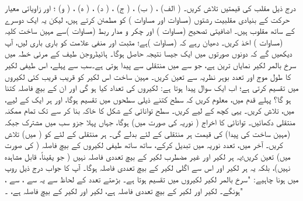 درج ذیل مقلب کی قیمتیں تلاش کریں۔
 ( الف) ، ( ب) ،
  ( ج) ، ( د) ،
   ( ه) ، ( و) ؛
      اور  زاویائی معیار حرکت کے بنیادی مقلبیت رشتوں  (مساوات    اور مساوات ) کو مطمئن کرتے ہیں،  لیکن یہ ایک دوسرے کے ساتھ مقلوب ہیں۔ 
اضافیتی تصحیح (مساوات )  اور چکر و مدار  ربط (مساوات  )سے مہین ساخت کلیہ  (مساوات )  اخذ  کریں۔  دھیان رہے کہ   (مساوات )ہے؛  مثبت  اور منفی علامت کو باری باری لیں، آپ دیکھیں گے کہ دونوں صورتوں میں  ایک    جیسا نتیجہ حاصل  ہوگا۔ 
 ہائیڈروجن     طیف  کے مرئی خطہ میں   سرخ  بالمر لکیر نمایاں ترین  ہے،  جو  سے  میں منتقلی سے پیدا ہوتی ہے۔سب سے پہلے،  اس طیفی  لکیر کا طول موج اور تعدد بوہر نظریہ سے تعین کریں۔  مہین ساخت اس لکیر کو قریب قریب کئی لکیروں میں تقسیم کرتی ہے؛   اب ایک سوال  پیدا ہوتا ہے: لکیروں کی تعداد کیا ہو گی  اور ان  کے بیچ فاصلہ کتنا ہو گا؟   پہلے قدم میں،  معلوم کریں کہ  سطح کتنے  ذیلی سطحوں میں تقسیم ہوگا،  اور ہر ایک کے لیے،   میں،   تلاش کریں۔  یہی کچھ  کے لیے کریں۔ سطح توانائی کے شکل کا خاکہ بنا کر  سے  تک تمام   ممکنہ منتقلی دکھائیں۔ توانائی کا اخراج     ( نوریہ کی صورت میں)  ہوگا،  جہاں پہلا جزو سب میں مشترک  جبکہ (مہین ساخت  کی پیدا)   کی قیمت  ہر  منتقلی کے لئے بدلے گی۔        ہر منتقلی کے لئے  کو (  میں) تلاش         کریں۔  آخر میں،   تعدد  نوریہ  میں تبدیل کرکے،   ساتھ ساتھ طیفی لکیروں کے بیچ فاصلہ  ( کی صورت   میں)  تعین کریں؛یہ    ہر لکیر  اور    غیر مضطرب لکیر  کے بیچ تعددی فاصلہ نہیں ( جو یقیناً،  قابل مشاہدہ نہیں)، بلکہ یہ ہر لکیر اور اس سے  اگلی لکیر کے بیچ تعددی فاصلہ ہوگا۔  آپ کا جواب درج ذیل روپ میں ہونا چاہیے:  "سرخ  بالمر لکیر  لکیروں میں تقسیم ہوتا ہے۔  بڑھتے تعدد کے لحاظ سے یہ   سے ،   سے ،  ہونگے۔  لکیر  اور لکیر  کے بیچ  تعددی فاصلہ   ہے،  لکیر  اور لکیر  کے بیچ فاصلہ   ہے،   ۔"
